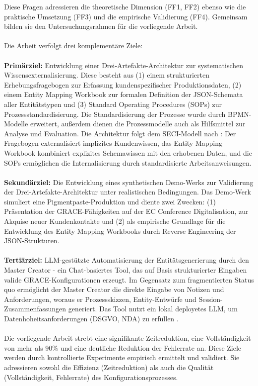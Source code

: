 \noindent Diese Fragen adressieren die theoretische Dimension (FF1, FF2) ebenso wie die praktische Umsetzung (FF3) und die empirische Validierung (FF4). Gemeinsam bilden sie den Untersuchungsrahmen für die vorliegende Arbeit.
\\\\
Die Arbeit verfolgt drei komplementäre Ziele:
\\\\
\textbf{Primärziel:} Entwicklung einer Drei-Artefakte-Architektur zur systematischen Wissensexternalisierung. Diese besteht aus (1) einem strukturierten Erhebungsfragebogen zur Erfassung kundenspezifischer Produktionsdaten, (2) einem Entity Mapping Workbook zur formalen Definition der JSON-Schemata aller Entitätstypen und (3) Standard Operating Procedures (SOPs) zur Prozessstandardisierung. Die Standardisierung der Prozesse wurde durch BPMN-Modelle erweitert, außerdem dienen die Prozessmodelle auch als Hilfsmittel zur Analyse und Evaluation. Die Architektur folgt dem SECI-Modell nach \cite{nonaka:knowledge_creating_company1995}: Der Fragebogen externalisiert implizites Kundenwissen, das Entity Mapping Workbook kombiniert explizites Schemawissen mit den erhobenen Daten, und die SOPs ermöglichen die Internalisierung durch standardisierte Arbeitsanweisungen.
\\\\ \textbf{Sekundärziel:} Die Entwicklung eines synthetischen Demo-Werks zur Validierung der Drei-Artefakte-Architektur unter realistischen Bedingungen. Das Demo-Werk simuliert eine Pigmentpaste-Produktion und diente zwei Zwecken: (1) Präsentation der GRACE-Fähigkeiten auf der EC Conference Digitalisation, zur Akquise neuer Kundenkontakte und (2) als empirische Grundlage für die Entwicklung des Entity Mapping Workbooks durch Reverse Engineering der JSON-Strukturen.
\\\\
\textbf{Tertiärziel:} LLM-gestützte Automatisierung der Entitätsgenerierung durch den \glqq Master Creator\grqq{} - ein Chat-basiertes Tool, das auf Basis strukturierter Eingaben valide GRACE-Konfigurationen erzeugt. Im Gegensatz zum fragmentierten Status quo ermöglicht der Master Creator die direkte Eingabe von Notizen und Anforderungen, woraus er Prozessskizzen, Entity-Entwürfe und Session-Zusammenfassungen generiert. Das Tool nutzt ein lokal deployetes LLM, um Datenhoheitsanforderungen (DSGVO, NDA) zu erfüllen \citep{hummel:data_sovereignty2021}.
\\\\
Die vorliegende Arbeit strebt eine signifikante Zeitreduktion, eine Vollständigkeit von mehr als 90\% und eine deutliche Reduktion der Fehlerrate an. Diese Ziele werden durch kontrollierte Experimente empirisch ermittelt und validiert. Sie adressieren sowohl die Effizienz (Zeitreduktion) als auch die Qualität (Vollständigkeit, Fehlerrate) des Konfigurationsprozesses.


